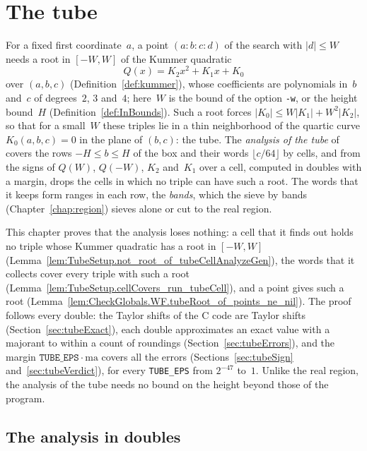\chapter{The tube}\label{chap:tube}

For a fixed first coordinate~$a$, a point $(a : b : c : d)$ of the search with $|d| \le W$ needs a
root in $[-W, W]$ of the Kummer quadratic
\[
  Q(x) = K_2 x^2 + K_1 x + K_0
\]
over $(a, b, c)$ (Definition~\ref{def:kummer}), whose coefficients are polynomials in~$b$ and~$c$
of degrees~$2$, $3$ and~$4$; here~$W$ is the bound of the option \texttt{-w}, or the height
bound~$H$ (Definition~\ref{def:InBounds}). Such a root forces $|K_0| \le W|K_1| + W^2|K_2|$, so that
for a small~$W$ these triples lie in a thin neighborhood of the quartic curve $K_0(a, b, c) = 0$ in
the plane of $(b, c)$: the tube. The \emph{analysis of the tube} of \jpoints{} covers the rows
$-H \le b \le H$ of the box and their words $\lfloor c/64 \rfloor$ by cells, and from the signs of
$Q(W)$, $Q(-W)$, $K_2$ and~$K_1$ over a cell, computed in doubles with a margin, drops the cells in
which no triple can have such a root. The words that it keeps form ranges in each row, the
\emph{bands}, which the sieve by bands (Chapter~\ref{chap:region}) sieves alone or cut to the real
region.

This chapter proves that the analysis loses nothing: a cell that it finds out holds no triple
whose Kummer quadratic has a root in $[-W, W]$
(Lemma~\ref{lem:TubeSetup.not_root_of_tubeCellAnalyzeGen}), the words that it collects cover every
triple with such a root (Lemma~\ref{lem:TubeSetup.cellCovers_run_tubeCell}), and a point gives such
a root (Lemma~\ref{lem:CheckGlobals.WF.tubeRoot_of_points_ne_nil}). The proof follows every double:
the Taylor shifts of the C code are Taylor shifts (Section~\ref{sec:tubeExact}), each double
approximates an exact value with a majorant to within a count of roundings
(Section~\ref{sec:tubeErrors}), and the margin $\mathtt{TUBE\_EPS} \cdot \mathrm{ma}$ covers all
the errors (Sections~\ref{sec:tubeSign} and~\ref{sec:tubeVerdict}), for every \texttt{TUBE\_EPS}
from $2^{-47}$ to~$1$. Unlike the real region, the analysis of the tube needs no bound on the
height beyond those of the program.

\section{The analysis in doubles}\label{sec:tubeModel}

